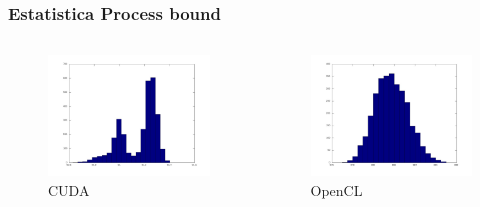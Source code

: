 \documentclass[brazil]{beamer}
\begin{document}
\begin{frame}[fragile]
  \frametitle{Estatistica Process bound}
  \begin{columns}
    \begin{column}{.5\textwidth}
      \begin{figure}
          \includegraphics[scale=0.15]{resultados_cuda_process_histo.jpg} \\
          CUDA        
      \end{figure}
    \end{column}
    \begin{column}{.5\textwidth}
      \begin{figure}
          \includegraphics[scale=0.15]{resultados_opencl_process_histo.jpg} \\
          OpenCL
      \end{figure}
    \end{column}
  \end{columns}
\end{frame}
\end{document}
